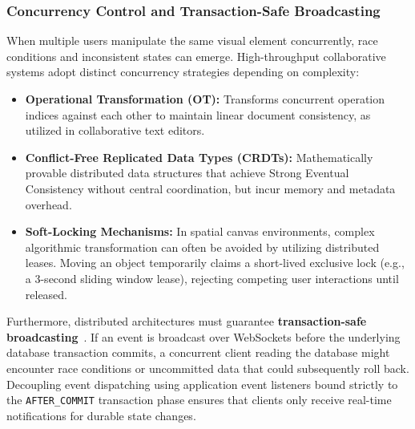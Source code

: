 \subsubsection{Concurrency Control and Transaction-Safe Broadcasting}
When multiple users manipulate the same visual element concurrently, race conditions and inconsistent states can emerge. High-throughput collaborative systems adopt distinct concurrency strategies depending on complexity:
\begin{itemize}
    \item \textbf{Operational Transformation (OT):} Transforms concurrent operation indices against each other to maintain linear document consistency, as utilized in collaborative text editors.
    \item \textbf{Conflict-Free Replicated Data Types (CRDTs):} Mathematically provable distributed data structures that achieve Strong Eventual Consistency without central coordination, but incur memory and metadata overhead.
    \item \textbf{Soft-Locking Mechanisms:} In spatial canvas environments, complex algorithmic transformation can often be avoided by utilizing distributed leases. Moving an object temporarily claims a short-lived exclusive lock (e.g., a 3-second sliding window lease), rejecting competing user interactions until released.
\end{itemize}

Furthermore, distributed architectures must guarantee \textbf{transaction-safe broadcasting}~\cite{spring_framework_doc}. If an event is broadcast over WebSockets before the underlying database transaction commits, a concurrent client reading the database might encounter race conditions or uncommitted data that could subsequently roll back. Decoupling event dispatching using application event listeners bound strictly to the \texttt{AFTER\_COMMIT} transaction phase ensures that clients only receive real-time notifications for durable state changes.

